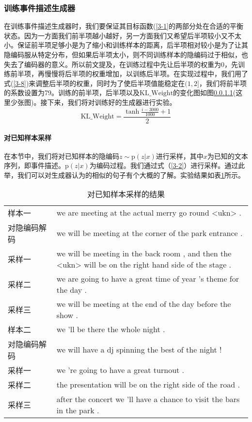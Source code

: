 \documentclass[]{template}
\begin{document}
\subsubsection{训练事件描述生成器}
在训练事件描述生成器时，我们要保证其目标函数(\ref{3-1}的两部分处在合适的平衡状态。因为一方面我们前半项越小越好，另一方面我们又希望后半项较小又不太小。保证前半项足够小是为了缩小和训练样本的距离，后半项相对较小是为了让其隐编码服从特定分布，但如果后半项太小，则不同训练样本的隐编码过于相似，也失去了编码器的意义。所以前文提及，在训练过程中先让后半项的权重为0，先训练前半项，再慢慢将后半项的权重增加，以训练后半项。在实现过程中，我们用了式(\ref{3-8})来调整后半项的权重，同时为了使后半项值能稳定在$(1,2]$，我们将前半项的系数设置为79。训练的前半项，后半项以及$\mathrm{KL\_Weight}$的变化图如图\ref{}(这里少张图)。接下来，我们将对训练好的生成器进行实验。
\begin{equation}\label{3-8}
    \mathrm{KL\_Weight}=\frac{\tanh\frac{i-3000}{1000}+1}{2}
\end{equation}

\paragraph{对已知样本采样}  
在本节中，我们将对已知样本的隐编码$z \sim \mathrm{p}(z|x)$进行采样，其中$x$为已知的文本序列，即事件描述。$\mathrm{p}(z|x)$为编码过程。我们通过式（\ref{3-2}）进行采样。通过此举，我们可以对生成器认为的相似的句子有个大概的了解。实验结果如表\ref{t3-2}所示。 
\begin{table}[htbp]
    \center
    \caption{\label{t3-2}对已知样本采样的结果}
    \begin{tabular*}{\linewidth}{p{0.2\linewidth}p{0.8\linewidth}}
\toprule
样本一 & we are meeting at the actual merry go round <ukn> . \\
对隐编码解码 & we will be meeting at the corner of the park entrance .\\ 
采样一 & we will be meeting in the back room , and then the <ukn> will be on the right hand side of the stage .\\
采样二 & we are going to have a great time of year 's theme for the day . \\
采样三 & we will be meeting at the end of the day before the show . \\
\midrule
样本二 & we 'll be there the whole night . \\
对隐编码解码 & we will have a dj spinning the best of the night !\\ 
采样一 & we 're going to have a great turnout .\\
采样二 & the presentation will be on the right side of the road .\\
采样三 & after the concert we 'll have a chance to visit the bars in the park . \\
\bottomrule
    \end{tabular*}
\end{table}
\end{document}

